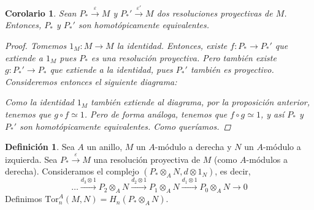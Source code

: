 \documentclass[12pt]{book}
\newtheorem{cor}[teo]{Corolario}
\theoremstyle{definition}
\newtheorem{defn}[teo]{Definición}
\begin{document}
\begin{cor}
Sean $P_*\stackrel{\varepsilon}{\longrightarrow} M$ y $P_*'\stackrel{\varepsilon'}{\longrightarrow} M$ dos resoluciones proyectivas de $M$. Entonces, $P_*$ y $P_*'$ son homotópicamente equivalentes.
\begin{proof}

Tomemos $1_M:M\to M$ la identidad. Entonces, existe $f:P_*\to P_*'$ que extiende a $1_M$ pues $P_*$ es una resolución proyectiva. Pero también existe $g:P_*'\to P_*$ que extiende a la identidad, pues $P_*'$ también es proyectivo. Consideremos entonces el siguiente diagrama:

\begin{center}\end{center}

Como la identidad $1_M$ también extiende al diagrama, por la proposición anterior, tenemos que $g\circ f \simeq 1$. Pero de forma análoga, tenemos que $f\circ g\simeq 1$, y así $P_*$ y $P_*'$ son homotópicamente equivalentes. Como queríamos.

\end{proof}
\end{cor}

\begin{defn}
Sea $A$ un anillo, $M$ un $A$-módulo a derecha y $N$ un $A$-módulo a izquierda. Sea $P_*\stackrel{\varepsilon}{\longrightarrow} M$ una resolución proyectiva de $M$ (como $A$-módulos a derecha). Consideramos el complejo $(P_*\otimes_A N,d\otimes 1_N)$, es decir, $$ \ldots \stackrel{d_3\otimes 1}{\longrightarrow} P_2\otimes_A N\stackrel{d_2\otimes 1}{\longrightarrow} P_1\otimes_A N\stackrel{d_1\otimes 1}{\longrightarrow} P_0\otimes_A N\longrightarrow 0$$ Definimos $\mathrm{Tor}_n^A(M,N) = H_n(P_*\otimes_A N)$.
\end{defn}
\end{document}
